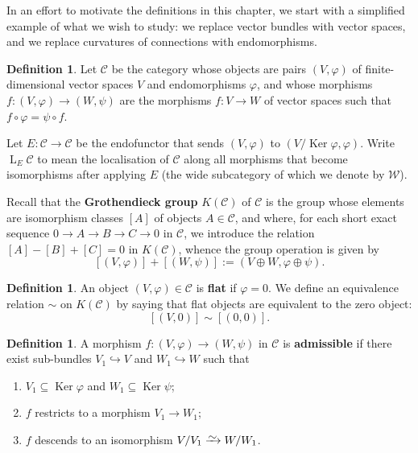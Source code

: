 \documentclass[11pt,fleqn]{article}
\theoremstyle{plain}
\theoremstyle{definition}
\newtheorem{definition}[theorem]{Definition}
\theoremstyle{remark}
\numberwithin{equation}{theorem}
\newcommand{\congto}{\xrightarrow{\raisebox{-.5ex}[0ex][0ex]{$\sim$}}}
\newcommand{\define}[1]{\textbf{#1}}
\DeclareMathOperator{\Ker}{Ker}
\DeclareMathOperator{\LL}{L}
\begin{document}
        In an effort to motivate the definitions in this chapter, we start with a simplified example of what we wish to study: we replace vector bundles with vector spaces, and we replace curvatures of connections with endomorphisms.

        \begin{definition}
            Let $\mathcal{C}$ be the category whose objects are pairs $(V,\varphi)$ of finite-dimensional vector spaces $V$ and endomorphisms $\varphi$, and whose morphisms $f\colon(V,\varphi)\to(W,\psi)$ are the morphisms $f\colon V\to W$ of vector spaces such that $f\circ\varphi=\psi\circ f$.

            Let $E\colon\mathcal{C}\to\mathcal{C}$ be the endofunctor that sends $(V,\varphi)$ to $(V/\Ker\varphi,\varphi)$.
            Write $\LL_E\mathcal{C}$ to mean the localisation of $\mathcal{C}$ along all morphisms that become isomorphisms after applying $E$ (the wide subcategory of which we denote by $\mathcal{W}$).
        \end{definition}

        Recall that the \define{Grothendieck group} $K(\mathcal{C})$ of $\mathcal{C}$ is the group whose elements are isomorphism classes $[A]$ of objects $A\in\mathcal{C}$, and where, for each short exact sequence $0\to A\to B\to C\to 0$ in $\mathcal{C}$, we introduce the relation $[A]-[B]+[C]=0$ in $K(\mathcal{C})$, whence the group operation is given by
        \[
            [(V,\varphi)] + [(W,\psi)]
            :=
            (V\oplus W,\varphi\oplus\psi).
        \]

        \begin{definition}
            An object $(V,\varphi)\in\mathcal{C}$ is \define{flat} if $\varphi=0$.
            We define an equivalence relation $\sim$ on $K(\mathcal{C})$ by saying that flat objects are equivalent to the zero object:
            \[
                [(V,0)]\sim[(0,0)].
            \]
        \end{definition}

        \begin{definition}\label{definition:admissible-morphism-in-C}
            A morphism $f\colon(V,\varphi)\to(W,\psi)$ in $\mathcal{C}$ is \define{admissible} if there exist sub-bundles $V_1\hookrightarrow V$ and $W_1\hookrightarrow W$ such that
            \begin{enumerate}
                \item $V_1\subseteq\Ker\varphi$ and $W_1\subseteq\Ker\psi$;
                \item $f$ restricts to a morphism $V_1\to W_1$;
                \item $f$ descends to an isomorphism $V/V_1\congto W/W_1$.
            \end{enumerate}
        \end{definition}
\end{document}
